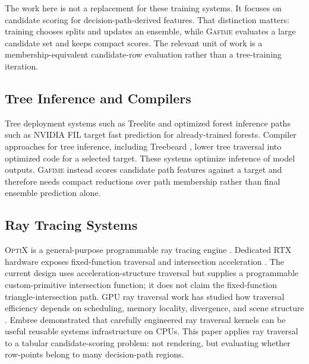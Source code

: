 \documentclass[11pt]{article}
\newcommand{\gafime}{\textsc{Gafime}\xspace}
\newcommand{\optix}{\textsc{OptiX}\xspace}
\begin{document}
The work here is not a replacement for these training systems. It focuses on
candidate scoring for decision-path-derived features. That distinction matters:
training chooses splits and updates an ensemble, while \gafime evaluates a
large candidate set and keeps compact scores. The relevant unit of work is a
membership-equivalent candidate-row evaluation rather than a tree-training
iteration.

\subsection{Tree Inference and Compilers}

Tree deployment systems such as Treelite \cite{cho2018treelite} and optimized
forest inference paths such as NVIDIA FIL \cite{nvidiafil} target fast
prediction for already-trained forests. Compiler approaches for tree inference,
including Treebeard \cite{vanessen2022treebeard}, lower tree traversal into
optimized code for a selected target. These systems optimize inference of model
outputs. \gafime instead scores candidate path features against a target and
therefore needs compact reductions over path membership rather than final
ensemble prediction alone.

\subsection{Ray Tracing Systems}

\optix is a general-purpose programmable ray tracing engine
\cite{parker2010optix}. Dedicated RTX hardware exposes fixed-function traversal
and intersection acceleration \cite{nvidia2018turing}. The current design uses
acceleration-structure traversal but supplies a programmable custom-primitive
intersection function; it does not claim the fixed-function triangle-intersection
path. GPU ray traversal work has studied how traversal efficiency depends on
scheduling, memory locality,
divergence, and scene structure \cite{aila2009understanding,
aila2012understanding}. Embree \cite{wald2014embree} demonstrated that
carefully engineered ray traversal kernels can be useful reusable systems
infrastructure on CPUs. This paper applies ray traversal to a tabular
candidate-scoring problem: not rendering, but evaluating whether row-points
belong to many decision-path regions.
\end{document}
